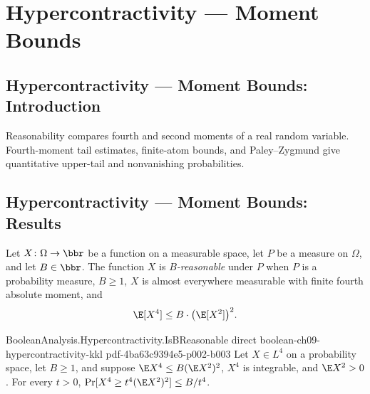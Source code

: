 \section{Hypercontractivity --- Moment Bounds}
\subsection*{Hypercontractivity --- Moment Bounds: Introduction}
Reasonability compares fourth and second moments of a real random variable. Fourth-moment tail estimates, finite-atom bounds, and Paley--Zygmund give quantitative upper-tail and nonvanishing probabilities.

\subsection*{Hypercontractivity --- Moment Bounds: Results}

\begin{definition}
\leanok
{}
\label{BooleanAnalysis.Hypercontractivity.IsBReasonable}
Let $X\colon\Omega\to\bbr$ be a function on a measurable space, let $P$ be a measure
on $\Omega$, and let $B\in\bbr$. The function $X$ is \emph{$B$-reasonable} under $P$
when $P$ is a probability measure, $B\ge1$, $X$ is almost everywhere measurable with
finite fourth absolute moment, and
\[
\E[X^4] \le B \cdot \bigl(\E[X^2]\bigr)^2 .
\]
\end{definition}

\begin{lemma}
\leanok
{}
\label{BooleanAnalysis.Hypercontractivity.b_reasonable_tail_bound}
\proofstep
  {BooleanAnalysis.Hypercontractivity.IsBReasonable}
  {direct}
  {boolean-ch09-hypercontractivity-kkl}
  {pdf-4ba63c9394e5-p002-b003}
Let $X\in L^4$ on a probability space, let $B\ge1$, and suppose $\E X^4\le B(\E X^2)^2$,
$X^4$ is integrable, and $\E X^2>0$. For every $t>0$, $\Pr[X^4\ge t^4(\E X^2)^2]\le
B/t^4$.
\end{lemma}

